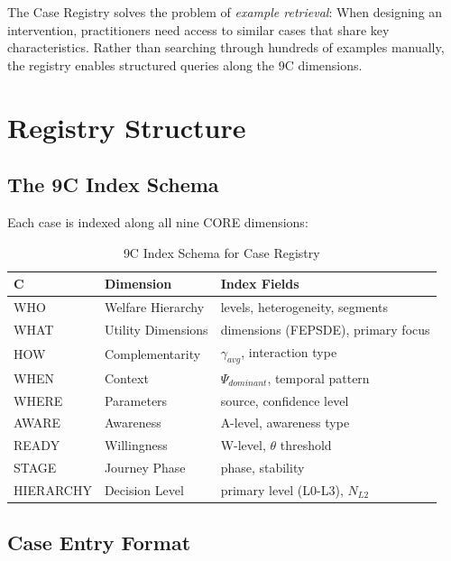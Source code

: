 The Case Registry solves the problem of \textit{example retrieval}: When designing an intervention, practitioners need access to similar cases that share key characteristics. Rather than searching through hundreds of examples manually, the registry enables structured queries along the 9C dimensions.

\section{Registry Structure}

\subsection{The 9C Index Schema}

Each case is indexed along all nine CORE dimensions:

\begin{table}[h]
\centering
\begin{tabular}{llp{6cm}}
\toprule
\textbf{C} & \textbf{Dimension} & \textbf{Index Fields} \\
\midrule
WHO & Welfare Hierarchy & levels, heterogeneity, segments \\
WHAT & Utility Dimensions & dimensions (FEPSDE), primary focus \\
HOW & Complementarity & $\gamma_{avg}$, interaction type \\
WHEN & Context & $\Psi_{dominant}$, temporal pattern \\
WHERE & Parameters & source, confidence level \\
AWARE & Awareness & A-level, awareness type \\
READY & Willingness & W-level, $\theta$ threshold \\
STAGE & Journey Phase & phase, stability \\
HIERARCHY & Decision Level & primary level (L0-L3), $N_{L2}$ \\
\bottomrule
\end{tabular}
\caption{9C Index Schema for Case Registry}
\end{table}

\subsection{Case Entry Format}

